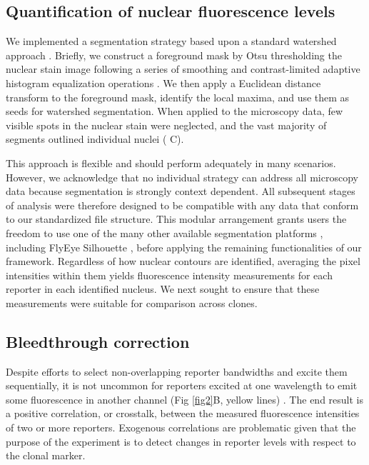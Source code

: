 \documentclass[10pt,letterpaper]{article}
\begin{document}
\subsection*{Quantification of nuclear fluorescence levels}
\label{ch:segmentation}

We implemented a segmentation strategy based upon a standard watershed approach \cite{VanderWalt2014}. Briefly, we construct a foreground mask by Otsu thresholding the nuclear stain image following a series of smoothing and contrast-limited adaptive histogram equalization operations \cite{NobuyukiOtsu1979,VanderWalt2014}. We then apply a Euclidean distance transform to the foreground mask, identify the local maxima, and use them as seeds for watershed segmentation. When applied to the microscopy data, few visible spots in the nuclear stain were neglected, and the vast majority of segments outlined individual nuclei ( C).

This approach is flexible and should perform adequately in many scenarios. However, we acknowledge that no individual strategy can address all microscopy data because segmentation is strongly context dependent. All subsequent stages of analysis were therefore designed to be compatible with any data that conform to our standardized file structure. This modular arrangement grants users the freedom to use one of the many other available segmentation platforms \cite{Bugarski2014}, including FlyEye Silhouette \cite{Pelaez2015a}, before applying the remaining functionalities of our framework. Regardless of how nuclear contours are identified, averaging the pixel intensities within them yields fluorescence intensity measurements for each reporter in each identified nucleus. We next sought to ensure that these measurements were suitable for comparison across clones.


\subsection*{Bleedthrough correction}
\label{ch:correction}

Despite efforts to select non-overlapping reporter bandwidths and excite them sequentially, it is not uncommon for reporters excited at one wavelength to emit some fluorescence in another channel (Fig \ref{fig2}B, yellow lines) \cite{Bacia2012,Zinchuk2007}. The end result is a positive correlation, or crosstalk, between the measured fluorescence intensities of two or more reporters. Exogenous correlations are problematic given that the purpose of the experiment is to detect changes in reporter levels with respect to the clonal marker.
\end{document}

